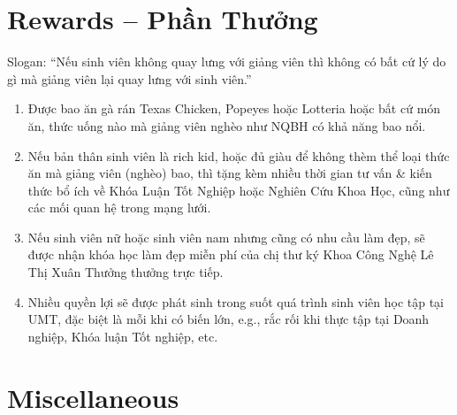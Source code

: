 \documentclass{article}
\begin{document}

\section{Rewards -- Phần Thưởng}
Slogan: ``Nếu sinh viên không quay lưng với giảng viên thì không có bất cứ lý do gì mà giảng viên lại quay lưng với sinh viên.''
\begin{enumerate}
    \item Được bao ăn gà rán Texas Chicken, Popeyes hoặc Lotteria hoặc bất cứ món ăn, thức uống nào mà giảng viên nghèo như NQBH có khả năng bao nổi.
    \item Nếu bản thân sinh viên là rich kid, hoặc đủ giàu để không thèm thể loại thức ăn mà giảng viên (nghèo) bao, thì tặng kèm nhiều thời gian tư vấn \& kiến thức bổ ích về Khóa Luận Tốt Nghiệp hoặc Nghiên Cứu Khoa Học, cũng như các mối quan hệ trong mạng lưới.
    \item Nếu sinh viên nữ hoặc sinh viên nam nhưng cũng có nhu cầu làm đẹp, sẽ được nhận khóa học làm đẹp miễn phí của chị thư ký Khoa Công Nghệ {\sc Lê Thị Xuân Thưởng} thưởng trực tiếp.
    \item Nhiều quyền lợi sẽ được phát sinh trong suốt quá trình sinh viên học tập tại UMT, đặc biệt là mỗi khi có biến lớn, e.g., rắc rối khi thực tập tại Doanh nghiệp, Khóa luận Tốt nghiệp, etc.
\end{enumerate}


\section{Miscellaneous}


\printbibliography[heading=bibintoc]
\end{document}
